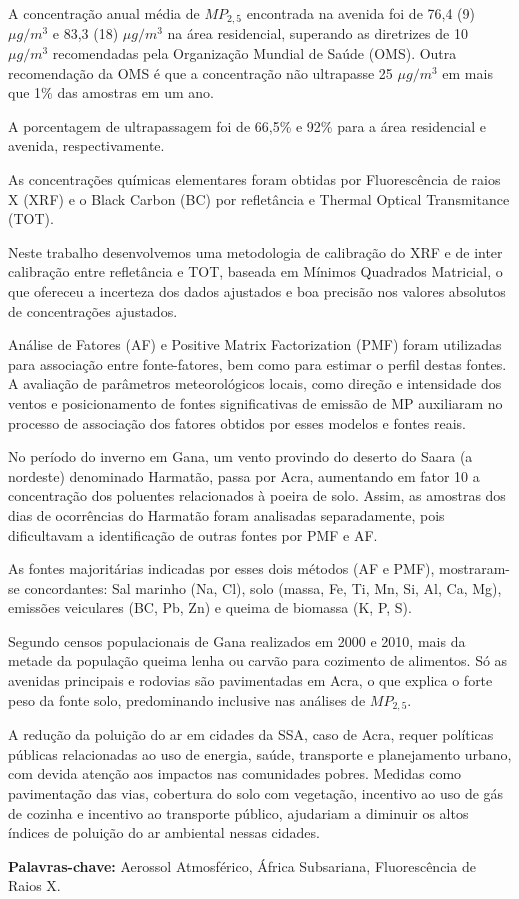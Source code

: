 A concentração anual média de $MP_{2,5}$ encontrada na avenida 
foi de 76,4 (9) $\mu g/m^3$ e 83,3 (18) $\mu g/m^3$ na área residencial, 
superando as diretrizes de 10 $\mu g/m^3$ recomendadas pela 
Organização Mundial de Saúde (OMS). 
Outra recomendação da OMS é que a concentração não ultrapasse 
25 $\mu g/m^3$ em mais que 1\% das amostras em um ano. 

A porcentagem de ultrapassagem foi de 66,5\% e 92\% para 
a área residencial e avenida, respectivamente. 

As concentrações químicas elementares foram obtidas por 
Fluorescência de raios X (XRF) e o Black Carbon (BC) por 
refletância e Thermal Optical Transmitance (TOT). 

Neste trabalho desenvolvemos uma metodologia de calibração do XRF 
e de inter calibração entre refletância e TOT, 
baseada em Mínimos Quadrados Matricial, o que ofereceu a 
incerteza dos dados ajustados e boa precisão nos valores 
absolutos de concentrações ajustados.

Análise de Fatores (AF) e Positive Matrix Factorization (PMF) foram utilizadas
para associação entre fonte-fatores, bem como para estimar o perfil destas fontes. 
A avaliação de parâmetros meteorológicos locais, como direção e intensidade 
dos ventos e posicionamento de fontes significativas de emissão de MP 
auxiliaram no processo de associação dos fatores obtidos por esses modelos e 
fontes reais. 

No período do inverno em Gana, um vento  
provindo do deserto do Saara (a nordeste) denominado Harmatão, 
passa por Acra, aumentando em fator 10 a concentração dos poluentes 
relacionados à poeira de solo. Assim, as amostras dos dias de ocorrências 
do Harmatão foram analisadas separadamente, pois dificultavam a 
identificação de outras fontes por PMF e AF.

As fontes majoritárias indicadas por esses dois métodos (AF e PMF), 
mostraram-se concordantes: Sal marinho (Na, Cl), solo (massa, Fe, Ti, Mn, 
Si, Al, Ca, Mg), emissões veiculares (BC, Pb, Zn) e queima de 
biomassa (K, P, S). 

Segundo censos populacionais de Gana realizados em 2000 e 2010, 
mais da metade da população queima lenha ou carvão para cozimento 
de alimentos. 
Só as avenidas principais e rodovias são pavimentadas em Acra, 
o que explica o forte peso da fonte solo, predominando 
inclusive nas análises de $MP_{2,5}$.

A redução da poluição do ar em cidades da SSA, caso de Acra, 
requer políticas públicas relacionadas ao uso de energia, saúde, 
transporte e planejamento urbano, com devida atenção 
aos impactos nas comunidades pobres. 
Medidas como pavimentação das vias, cobertura do solo com vegetação, 
incentivo ao uso de gás de cozinha e incentivo ao transporte público, 
ajudariam a diminuir os altos índices de poluição do ar ambiental nessas cidades.



\par
\vspace{1em}
\noindent\textbf{Palavras-chave:}  Aerossol Atmosférico, África Subsariana, Fluorescência de Raios X.
\newpage
